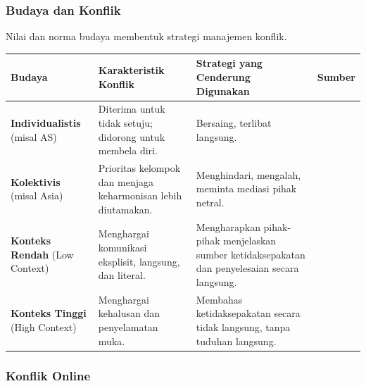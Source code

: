 \documentclass[
  letterpaper,
  DIV=11,
  numbers=noendperiod]{scrreprt}
\begin{document}
\subsubsection{Budaya dan Konflik}\label{budaya-dan-konflik}

Nilai dan norma budaya membentuk strategi manajemen konflik.

\begin{longtable}[]{@{}
  >{\raggedright\arraybackslash}p{}
  >{\raggedright\arraybackslash}p{}
  >{\raggedright\arraybackslash}p{}
  >{\raggedright\arraybackslash}p{}@{}}
\toprule\noalign{}
\begin{minipage}[b]{\linewidth}\raggedright
Budaya
\end{minipage} & \begin{minipage}[b]{\linewidth}\raggedright
Karakteristik Konflik
\end{minipage} & \begin{minipage}[b]{\linewidth}\raggedright
Strategi yang Cenderung Digunakan
\end{minipage} & \begin{minipage}[b]{\linewidth}\raggedright
Sumber
\end{minipage} \\
\midrule\noalign{}
\endhead
\bottomrule\noalign{}
\endlastfoot
\textbf{Individualistis} (misal AS) & Diterima untuk tidak setuju;
didorong untuk membela diri. & Bersaing, terlibat langsung. & \\
\textbf{Kolektivis} (misal Asia) & Prioritas kelompok dan menjaga
keharmonisan lebih diutamakan. & Menghindari, mengalah, meminta mediasi
pihak netral. & \\
\textbf{Konteks Rendah} (Low Context) & Menghargai komunikasi eksplisit,
langsung, dan literal. & Mengharapkan pihak-pihak menjelaskan sumber
ketidaksepakatan dan penyelesaian secara langsung. & \\
\textbf{Konteks Tinggi} (High Context) & Menghargai kehalusan dan
penyelamatan muka. & Membahas ketidaksepakatan secara tidak langsung,
tanpa tuduhan langsung. & \\
\end{longtable}

\subsubsection{Konflik Online}\label{konflik-online}
\end{document}

